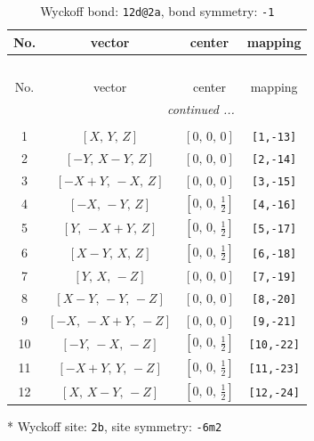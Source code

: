 \documentclass[fleqn,8pt]{jsarticle}
\begin{document}
\begin{longtable}{cccc}
\caption{Wyckoff bond: {\tt 12d@2a}, bond symmetry: {\tt -1}}
 \\
 \hline \hline
No. & vector & center & mapping \\ \hline \endfirsthead

\multicolumn{3}{l}{\tablename\ \thetable{}} \\
 \hline \hline
No. & vector & center & mapping \\ \hline \endhead

 \hline \hline
\multicolumn{3}{r}{\footnotesize\it continued ...} \\ \endfoot

 \hline \hline
\multicolumn{3}{r}{} \\ \endlastfoot

1 & $\left[ X,\, Y,\, Z \right]$ & $\left[ 0,\, 0,\, 0 \right]$ & {\tt [1,-13]} \\ \hline
2 & $\left[ - Y,\, X - Y,\, Z \right]$ & $\left[ 0,\, 0,\, 0 \right]$ & {\tt [2,-14]} \\ \hline
3 & $\left[ - X + Y,\, - X,\, Z \right]$ & $\left[ 0,\, 0,\, 0 \right]$ & {\tt [3,-15]} \\ \hline
4 & $\left[ - X,\, - Y,\, Z \right]$ & $\left[ 0,\, 0,\, \frac{1}{2} \right]$ & {\tt [4,-16]} \\ \hline
5 & $\left[ Y,\, - X + Y,\, Z \right]$ & $\left[ 0,\, 0,\, \frac{1}{2} \right]$ & {\tt [5,-17]} \\ \hline
6 & $\left[ X - Y,\, X,\, Z \right]$ & $\left[ 0,\, 0,\, \frac{1}{2} \right]$ & {\tt [6,-18]} \\ \hline
7 & $\left[ Y,\, X,\, - Z \right]$ & $\left[ 0,\, 0,\, 0 \right]$ & {\tt [7,-19]} \\ \hline
8 & $\left[ X - Y,\, - Y,\, - Z \right]$ & $\left[ 0,\, 0,\, 0 \right]$ & {\tt [8,-20]} \\ \hline
9 & $\left[ - X,\, - X + Y,\, - Z \right]$ & $\left[ 0,\, 0,\, 0 \right]$ & {\tt [9,-21]} \\ \hline
10 & $\left[ - Y,\, - X,\, - Z \right]$ & $\left[ 0,\, 0,\, \frac{1}{2} \right]$ & {\tt [10,-22]} \\ \hline
11 & $\left[ - X + Y,\, Y,\, - Z \right]$ & $\left[ 0,\, 0,\, \frac{1}{2} \right]$ & {\tt [11,-23]} \\ \hline
12 & $\left[ X,\, X - Y,\, - Z \right]$ & $\left[ 0,\, 0,\, \frac{1}{2} \right]$ & {\tt [12,-24]} \\
\end{longtable}
* Wyckoff site: {\tt 2b}, site symmetry: {\tt -6m2}
\end{document}
